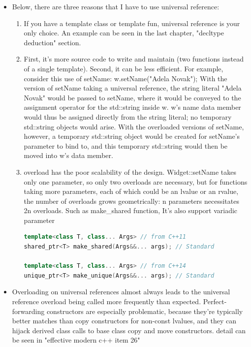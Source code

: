 \documentclass[a4paper,12pt,twoside]{book}
\begin{document}
\begin{itemize}
\item Below, there are three reasons that I have to use universal reference:
\begin{enumerate}
\item If you have a template class or template fun, universal reference is your only choice. An example can be seen in the last chapter, "decltype deduction" section.

\item First, it's more source code to write and maintain (two functions instead of a single template). Second, it can be less efficient. For example, consider this use of setName:
w.setName("Adela Novak"); With the version of setName taking a universal reference, the string literal "Adela Novak" would be passed to setName, where it would be conveyed to the assignment
operator for the std::string inside w. w's name data member would thus be assigned
directly from the string literal; no temporary std::string objects would arise. With
the overloaded versions of setName, however, a temporary std::string object
would be created for setName's parameter to bind to, and this temporary
std::string would then be moved into w's data member.

\item overload has the poor scalability of the design. Widget::setName takes only one parameter, so
only two overloads are necessary, but for functions taking more parameters, each of
which could be an lvalue or an rvalue, the number of overloads grows geometrically: n parameters necessitates 2n overloads. Such as make\_shared function, It's also support variadic parameter

\begin{lstlisting}[frame=single, language=c++]
template<class T, class... Args> // from C++11
shared_ptr<T> make_shared(Args&&... args); // Standard

template<class T, class... Args> // from C++14
unique_ptr<T> make_unique(Args&&... args); // Standard
\end{lstlisting}

\end{enumerate}


\item Overloading on universal references almost always leads to the universal reference
overload being called more frequently than expected. Perfect-forwarding constructors are especially problematic, because they're typically better matches than copy constructors for non-const lvalues, and
they can hijack derived class calls to base class copy and move constructors. detail can be seen in "effective modern c++ item 26"


\end{itemize}
\end{document}
